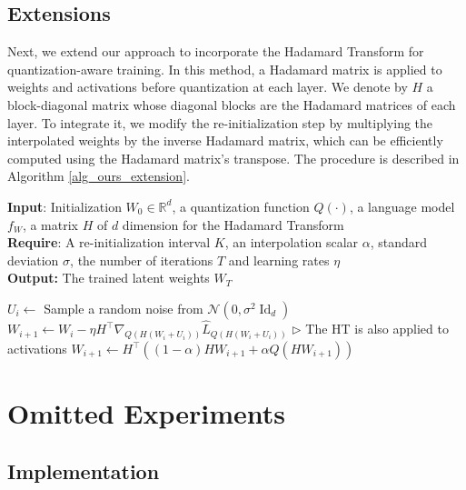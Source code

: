 \documentclass{article}
\theoremstyle{definition}
\DeclareMathOperator{\id}{Id}
\newcommand{\real}{\mathbb{R}}
\newcommand{\LineComment}[1]{\(\triangleright\) #1}
\newcommand{\acronym}{{\sc WinQ}}
\begin{document}
\subsection{Extensions}

Next, we extend our approach to incorporate the Hadamard Transform for quantization-aware training. In this method, a Hadamard matrix is applied to weights and activations before quantization at each layer. We denote by $H$ a block-diagonal matrix whose diagonal blocks are the Hadamard matrices of each layer. 
To integrate it, we modify the re-initialization step by multiplying the interpolated weights by the inverse Hadamard matrix, which can be efficiently computed using the Hadamard matrix's transpose. The procedure is described in Algorithm \ref{alg_ours_extension}.

\begin{algorithm}[t!]
    	\caption{\acronym{} with the Hadamard Transform}\label{alg_ours_extension}
        \textbf{Input}: Initialization $W_0\in\real^d$, a quantization function $Q(\cdot)$, a language model $f_W$, a matrix $H$ of $d$ dimension for the Hadamard Transform\\
        \textbf{Require}: A re-initialization interval $K$, an interpolation scalar $\alpha$, standard deviation $\sigma$, the number of iterations $T$ and learning rates $\eta$ \\
        \textbf{Output: } The trained latent weights $W_T$  
        \begin{algorithmic}[1] %
                \STATE $U_i \leftarrow$ Sample a random noise from $\mathcal{N}(0, \sigma^2 \id_d)$ 
                \STATE $W_{i + 1} \leftarrow W_i - {\eta} H^{\top} \nabla_{Q(H(W_i+U_i))} \hat{L}_{Q(H(W_i+U_i))}$ \LineComment{The HT is also applied to activations}
                \STATE $W_{i+1} \leftarrow H^\top \left( (1-\alpha) HW_{i+1} + \alpha Q(H W_{i+1}) \right) $
                \ENDIF
            \ENDFOR
        \end{algorithmic}
    \end{algorithm}      



\section{Omitted Experiments}\label{sec_additional_exp}



\subsection{Implementation}
\end{document}
